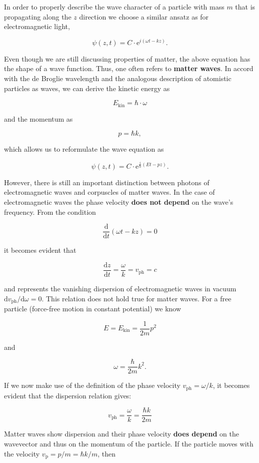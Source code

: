 \documentclass[
  a4paper,
]{book}
\begin{document}
In order to properly describe the wave character of a particle with mass
\(m\) that is propagating along the \(z\) direction we choose a similar
ansatz as for electromagnetic light,

\[
\psi \left( z,t \right) = C \cdot \mathrm{e}^{i\left(\omega t - k z  \right)} \mathrm{.}
\]

Even though we are still discussing properties of matter, the above
equation has the shape of a wave function. Thus, one often refers to
\textbf{matter waves}. In accord with the de Broglie wavelength and the
analogous description of atomistic particles as waves, we can derive the
kinetic energy as

\[
E_{\mathrm{kin}} = \hbar \cdot \omega
\]

and the momentum as

\[
p = \hbar k \mathrm{,}
\]

which allows us to reformulate the wave equation as

\[
\psi \left( z,t \right) = C \cdot \mathrm{e}^{\frac{i}{\hbar} \left(E t - p z  \right)} \mathrm{.}
\]

However, there is still an important distinction between photons of
electromagnetic waves and corpuscles of matter waves. In the case of
electromagnetic waves the phase velocity \textbf{does not depend} on the
wave's frequency. From the condition

\[
\frac{\mathrm{d}}{\mathrm{d}t} \left( \omega t - k z \right) = 0
\]

it becomes evident that

\[
\frac{\mathrm{d}z}{\mathrm{d}t} = \frac{\omega}{k} = v_{\mathrm{ph}} = c
\]

and represents the vanishing dispersion of electromagnetic waves in
vacuum \(\mathrm{d}v_{\mathrm{ph}}/ \mathrm{d} \omega = 0\). This
relation does not hold true for matter waves. For a free particle
(force-free motion in constant potential) we know

\[
E = E_{\mathrm{kin}} = \frac{1}{2m}p^2
\]

and

\[
\omega = \frac{\hbar}{2m}k^2 \mathrm{.}
\]

If we now make use of the definition of the phase velocity
\(v_{\mathrm{ph}} = \omega / k\), it becomes evident that the dispersion
relation gives:

\[
v_{\mathrm{ph}} = \frac{\omega}{k} = \frac{\hbar k}{2m}
\]

Matter waves show dispersion and their phase velocity \textbf{does
depend} on the wavevector and thus on the momentum of the particle. If
the particle moves with the velocity
\(v_{\mathrm{p}} = p/m = \hbar k / m\), then
\end{document}
